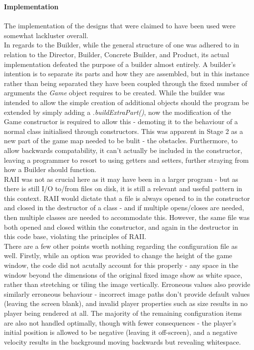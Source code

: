 \documentclass[11pt]{article}
\begin{document}
{\large\textbf{Implementation}}\\\\
The implementation of the designs that were claimed to have been used were somewhat lackluster overall.\\

In regards to the Builder, while the general structure of one was adhered to in relation to the Director, Builder, Concrete Builder, and Product, its actual implementation defeated the purpose of a builder almost entirely. A builder's intention is to separate its parts and how they are assembled, but in this instance rather than being separated they have been coupled through the fixed number of arguments the \textit{Game} object requires to be created. While the builder was intended to allow the simple creation of additional objects should the program be extended by simply adding a \textit{.buildExtraPart()}, now the modification of the Game constructor is required to allow this - demoting it to the behaviour of a normal class initialised through constructors. This was apparent in Stage 2 as a new part of the game map needed to be bulit - the obstacles. Furthermore, to allow backwards compatability, it can't actually be included in the constructor, leaving a programmer to resort to using getters and setters, further straying from how a Builder should function.\\

RAII was not as crucial here as it may have been in a larger program - but as there is still I/O to/from files on disk, it is still a relevant and useful pattern in this context. RAII would dictate that a file is always opened to in the constructor and closed in the destructor of a class - and if multiple opens/closes are needed, then multiple classes are needed to accommodate this. However, the same file was both opened and closed within the constructor, and again in the destructor in this code base, violating the principles of RAII.\\

There are a few other points worth nothing regarding the configuration file as well. Firstly, while an option was provided to change the height of the game window, the code did not acutally account for this properly - any space in the window beyond the dimensions of the original fixed image show as white space, rather than stretching or tiling the image vertically. Erroneous values also provide similarly erroneous behaviour - incorrect image paths don't provide default values (leaving the screen blank), and invalid player properties such as size results in no player being rendered at all. The majority of the remaining configuration items are also not handled optimally, though with fewer consequences - the player's initial position is allowed to be negative (leaving it off-screen), and a negative velocity results in the background moving backwards but revealing whitespace.
\\\\
\end{document}
